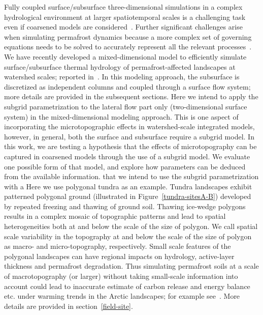 \documentclass[review,11pt]{elsarticle}
\begin{document}
Fully coupled surface/subsurface three-dimensional simulations in a complex hydrological environment at larger spatiotemporal scales is a challenging task even if coarsened models are considered~\cite{frei2010effects}. Further significant challenges arise when simulating permafrost dynamics because a more complex set of governing equations needs to be solved to accurately represent all the relevant processes~\cite{painter2013modeling,jan2017}. We have recently developed a mixed-dimensional model to efficiently simulate surface/subsurface thermal hydrology of permafrost-affected landscapes at watershed scales; reported in~\cite{jan2017}. In this modeling approach, the subsurface is discretized as independent columns and coupled through a surface flow system; more details are provided in the subsequent sections. Here we intend to apply the subgrid parametrization to the lateral flow part only (two-dimensional surface system) in the mixed-dimensional modeling approach. This is one aspect of incorporating the microtopographic effects in watershed-scale integrated models, however, in general, both the surface and subsurface require a subgrid model. 
In this work, we are testing a hypothesis that the effects of microtopography can be captured in coarsened models through the use of a subgrid model. We evaluate one possible form of that model, and explore how parameters can be deduced from the available information.
that we intend to use the subgrid parametrization with a
Here we use polygonal tundra as an example. Tundra landscapes exhibit patterned polygonal ground (illustrated in Figure~\ref{tundra-sitesA-B}) developed by repeated freezing and thawing of ground soil. Thawing ice-wedge polygons results in a complex mosaic of topographic patterns and lead to spatial heterogeneities both at and below the scale of the size of polygon. We call spatial scale variability in the topography at and below the scale of the size of polygon as macro- and micro-topography, respectively. Small scale features of the polygonal landscapes can have regional impacts on hydrology, active-layer thickness and permafrost degradation. Thus simulating permafrost soils at a scale of macrotopography (or larger) without taking small-scale information into account could lead to inaccurate estimate of carbon release and energy balance etc. under warming trends in the Arctic landscapes; for example see~\cite{liljedahl2016pan,lu2012modeling,andresen2015disappearing,holden2005peatland}. More details are provided in section~\ref{field-site}.
\end{document}
